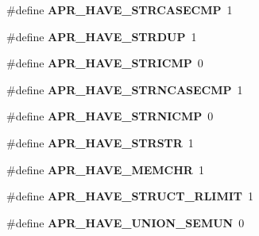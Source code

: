 \begin{DoxyCompactItemize}
\item 
\#define {\bfseries A\+P\+R\+\_\+\+H\+A\+V\+E\+\_\+\+S\+T\+R\+C\+A\+S\+E\+C\+MP}~1\hypertarget{group__apr__platform_ga4da5b6343c5b896efb3695c94f8dd374}{}\label{group__apr__platform_ga4da5b6343c5b896efb3695c94f8dd374}

\item 
\#define {\bfseries A\+P\+R\+\_\+\+H\+A\+V\+E\+\_\+\+S\+T\+R\+D\+UP}~1\hypertarget{group__apr__platform_ga73cf943f6399274e71979e902b3030a0}{}\label{group__apr__platform_ga73cf943f6399274e71979e902b3030a0}

\item 
\#define {\bfseries A\+P\+R\+\_\+\+H\+A\+V\+E\+\_\+\+S\+T\+R\+I\+C\+MP}~0\hypertarget{group__apr__platform_ga07a4215d05bb012f8ff9c4c681b2f9a3}{}\label{group__apr__platform_ga07a4215d05bb012f8ff9c4c681b2f9a3}

\item 
\#define {\bfseries A\+P\+R\+\_\+\+H\+A\+V\+E\+\_\+\+S\+T\+R\+N\+C\+A\+S\+E\+C\+MP}~1\hypertarget{group__apr__platform_ga8f45d52206b5d6ee37dc05e53d9bd93c}{}\label{group__apr__platform_ga8f45d52206b5d6ee37dc05e53d9bd93c}

\item 
\#define {\bfseries A\+P\+R\+\_\+\+H\+A\+V\+E\+\_\+\+S\+T\+R\+N\+I\+C\+MP}~0\hypertarget{group__apr__platform_gadc5209ed6b80ac6734ce2a13a3a2273d}{}\label{group__apr__platform_gadc5209ed6b80ac6734ce2a13a3a2273d}

\item 
\#define {\bfseries A\+P\+R\+\_\+\+H\+A\+V\+E\+\_\+\+S\+T\+R\+S\+TR}~1\hypertarget{group__apr__platform_ga2850a7c280e08a629d2b0bc2eeb97b41}{}\label{group__apr__platform_ga2850a7c280e08a629d2b0bc2eeb97b41}

\item 
\#define {\bfseries A\+P\+R\+\_\+\+H\+A\+V\+E\+\_\+\+M\+E\+M\+C\+HR}~1\hypertarget{group__apr__platform_ga510e98c8dd8ef45a6c902b8daaedc3a4}{}\label{group__apr__platform_ga510e98c8dd8ef45a6c902b8daaedc3a4}

\item 
\#define {\bfseries A\+P\+R\+\_\+\+H\+A\+V\+E\+\_\+\+S\+T\+R\+U\+C\+T\+\_\+\+R\+L\+I\+M\+IT}~1\hypertarget{group__apr__platform_ga2519340ecb3c313c81d36d70335430f9}{}\label{group__apr__platform_ga2519340ecb3c313c81d36d70335430f9}

\item 
\#define {\bfseries A\+P\+R\+\_\+\+H\+A\+V\+E\+\_\+\+U\+N\+I\+O\+N\+\_\+\+S\+E\+M\+UN}~0\hypertarget{group__apr__platform_ga40fd92f709fa181dee59734f4564ead1}{}\label{group__apr__platform_ga40fd92f709fa181dee59734f4564ead1}


\end{DoxyCompactItemize}

